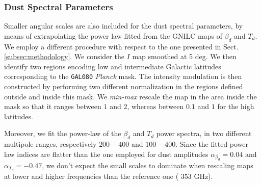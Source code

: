 


\subsubsection{Dust Spectral Parameters}
Smaller angular scales are also included for the dust spectral parameters, by means of extrapolating the power law fitted from the GNILC  maps of $\beta_d$ and $T_d$.  We employ a different procedure with respect to the one presented in Sect. \ref{subsec:methodology}.  
We consider the $I$ map smoothed  at 5 deg.  We then identify two  regions encoding  low and intermediate Galactic latitudes corresponding to the  \texttt{GAL080} \emph{Planck} mask.  The  intensity modulation is then constructed by performing two different normalization in the regions defined outside and inside  this mask.  We \emph{min-max} rescale the map in the area inside the mask so that it  ranges   between $1$ and $2$, whereas    between $0.1$ and $1$ for the high latitudes.

Moreover, we fit the power-law of the $\beta_d$ and $T_d$ power  spectra, in two different multipole ranges, respectively $200-400$ and $100-400$.  Since the fitted power law  indices are  flatter than the one employed for dust amplitudes  $\alpha_{\beta_d}= 0.04$ and $\alpha_{T_d} = -0.47$, we don't expect the  small scales to dominate when rescaling maps at lower and higher frequencies than the reference one ( 353 GHz). 


